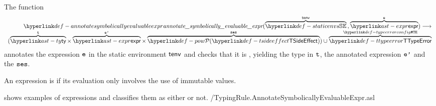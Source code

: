 \begin{mathpar}
\end{mathpar}

\begin{mathpar}
\end{mathpar}

\begin{mathpar}
\end{mathpar}

\hypertarget{def-annotatesymbolicallyevaluableexpr}{}
The function
\[
\begin{array}{r}
  \annotatesymbolicallyevaluableexpr(\overname{\staticenvs}{\tenv} \aslsep \overname{\expr}{\ve}) \aslto \\
  (\overname{\ty}{\vt}\times\overname{\expr}{\vep}\times\overname{\TSideEffectSet}{\vses}) \cup \overname{\TTypeError}{\TypeErrorConfig}
\end{array}
\]
annotates the expression $\ve$ in the static environment $\tenv$ and checks that it is \symbolicallyevaluable,
yielding the type in $\vt$, the annotated expression $\vep$ and the \sideeffectsetterm{} $\vses$.
\ProseOtherwiseTypeError

An expression is \symbolicallyevaluable{} if its evaluation only involves
the use of immutable values.

 shows examples of
expressions and classifies them as either \symbolicallyevaluable{} or not.
{\typingtests/TypingRule.AnnotateSymbolicallyEvaluableExpr.asl}

